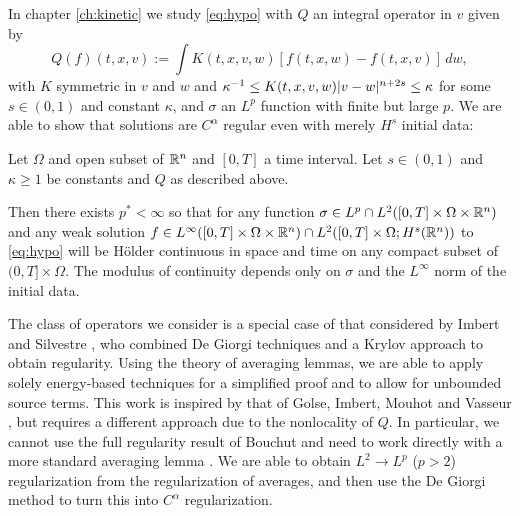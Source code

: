 In chapter \ref{ch:kinetic} we study \eqref{eq:hypo} with $Q$ an integral operator in $v$ given by
\[ Q(f)(t,x,v) := \int K(t,x,v,w) [f(t,x,w) - f(t,x,v)] \,dw, \]
with $K$ symmetric in $v$ and $w$ and $\kappa^{-1} \leq K(t,x,v,w)|v-w|^{n+2s} \leq \kappa$ for some $s \in (0,1)$ and constant $\kappa$, and $\sigma$ an $L^p$ function with finite but large $p$.  
We are able to show that solutions are $C^\alpha$ regular even with merely $H^s$ initial data:
\begin{theorem}
Let $\Omega$ and open subset of $\mathbb{R}^n$ and $[0,T]$ a time interval.  Let $s \in (0,1)$ and $\kappa \geq 1$ be constants and $Q$ as described above.  

Then there exists $p^* < \infty$ so that for any function $\sigma \in L^p \cap L^2([0,T] \times \Omega \times \mathbb{R}^n)$ and any weak solution $f \in L^\infty([0,T] \times \Omega \times \mathbb{R}^n) \cap L^2([0,T]\times\Omega; H^s(\mathbb{R}^n))$ to \eqref{eq:hypo} will be H\"{o}lder continuous in space and time on any compact subset of $(0,T]\times \Omega$.  The modulus of continuity depends only on $\sigma$ and the $L^\infty$ norm of the initial data.  
\end{theorem}
The class of operators we consider is a special case of that considered by Imbert and Silvestre \cite{ImSi}, who combined De Giorgi techniques and a Krylov approach to obtain regularity.  Using the theory of averaging lemmas, we are able to apply solely energy-based techniques for a simplified proof and to allow for unbounded source terms.  This work is inspired by that of Golse, Imbert, Mouhot and Vasseur \cite{GoImMoVa}, but requires a different approach due to the nonlocality of $Q$.  In particular, we cannot use the full regularity result of Bouchut and need to work directly with a more standard averaging lemma \cite{Be}.  We are able to obtain $L^2 \to L^p$ ($p>2$) regularization from the regularization of averages, and then use the De Giorgi method to turn this into $C^\alpha$ regularization.  




